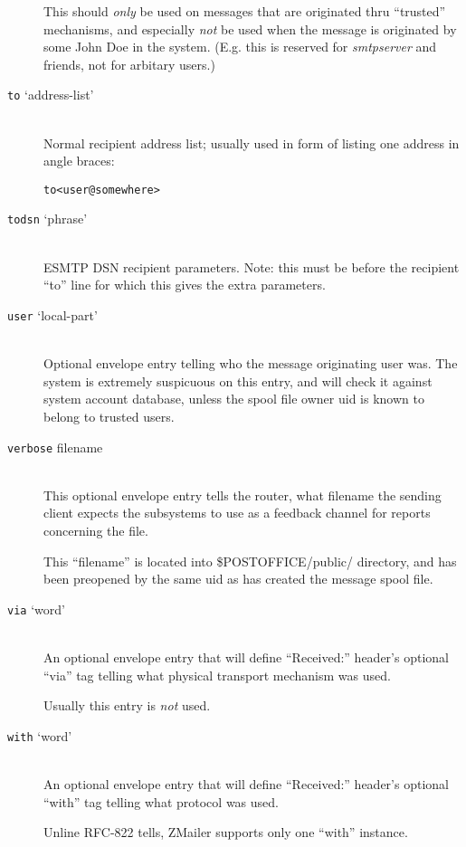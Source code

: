 \begin{description}
This should {\em only} be used on messages that are originated
thru ``trusted'' mechanisms, and especially {\em not} be used
when the message is originated by some John Doe in the system.
(E.g. this is reserved for {\em smtpserver} and friends, not
 for arbitary users.)

\item[{\tt to} `address-list'] \mbox{} \\
Normal recipient address list; usually used in form of listing
one address in angle braces:
\begin{alltt}
  to <user@somewhere>
\end{alltt}

\item[{\tt todsn} `phrase'] \mbox{} \\
ESMTP DSN recipient parameters.
Note: this must be before the recipient ``to'' line for which
this gives the extra parameters.

\item[{\tt user} `local-part'] \mbox{} \\
Optional envelope entry telling who the message originating user
was.   The system is extremely suspicuous on this entry, and will
check it against system account database, unless the spool file
owner uid is known to belong to trusted users.

\item[{\tt verbose} filename] \mbox{} \\
This optional envelope entry tells the router, what filename
the sending client expects the subsystems to use as a feedback
channel for reports concerning the file.

This ``filename'' is located into  \$POSTOFFICE/public/ directory,
and has been preopened by the same uid as has created the message
spool file.

\item[{\tt via} `word'] \mbox{} \\
An optional envelope entry that will define ``Received:'' header's
optional ``via'' tag telling what physical transport mechanism was
used.

Usually this entry is {\em not} used.

\item[{\tt with} `word'] \mbox{} \\
An optional envelope entry that will define ``Received:'' header's
optional ``with'' tag telling what protocol was used.

Unline RFC-822 tells, ZMailer supports only one ``with'' instance.

\end{description}


